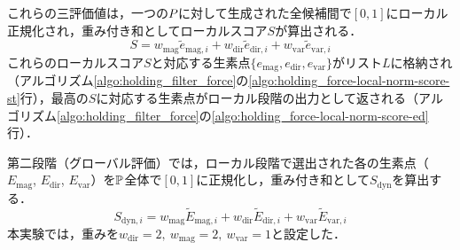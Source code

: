 これらの三評価値は，一つの{\nameholdingpointset}$\equholdingpointset$に対して生成された全{\namegraspforce}候補間で$[0,1]$にローカル正規化され，重み付き和としてローカルスコア$S$が算出される．
\begin{equation}
    S = w_{\mathrm{mag}} \tilde{e}_{\mathrm{mag,}i} + w_{\mathrm{dir}} \tilde{e}_{\mathrm{dir,}i} + w_{\mathrm{var}} \tilde{e}_{\mathrm{var,}i}
    \label{equ:holding_force_local_score}
\end{equation}
これらのローカルスコア$S$と対応する生素点$\{e_{\mathrm{mag}}, e_{\mathrm{dir}}, e_{\mathrm{var}}\}$がリスト$L$に格納され（アルゴリズム\ref{algo:holding_filter_force}の\ref{algo:holding_force-local-norm-score-st}行），最高の$S$に対応する生素点がローカル段階の出力として返される（アルゴリズム\ref{algo:holding_filter_force}の\ref{algo:holding_force-local-norm-score-ed}行）．

第二段階（グローバル評価）では，ローカル段階で選出された各{\nameholdingpointset}の生素点（$E_{\mathrm{mag}}$, $E_{\mathrm{dir}}$, $E_{\mathrm{var}}$）を{\namesearchspace}$\mathbb{P}$全体で$[0,1]$に正規化し，重み付き和として$S_{\mathrm{dyn}}$を算出する．
\begin{equation}
S_{\mathrm{dyn},i} = w_{\mathrm{mag}} \tilde{E}_{\mathrm{mag,}i} + w_{\mathrm{dir}} \tilde{E}_{\mathrm{dir,}i} + w_{\mathrm{var}} \tilde{E}_{\mathrm{var,}i}
\label{equ:holding_force_final_score}
\end{equation}
本実験では，重みを$w_{\mathrm{dir}}=2,\ w_{\mathrm{mag}}=2,\ w_{\mathrm{var}}=1$と設定した．

